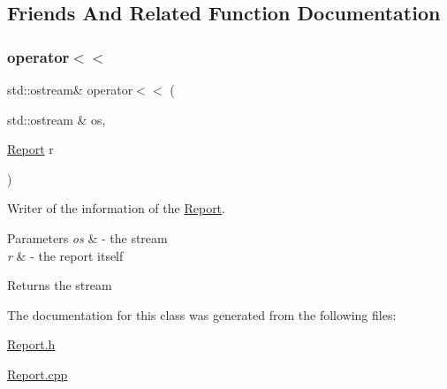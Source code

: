 \subsection{Friends And Related Function Documentation}
\mbox{\label{class_report_a9c2eaa693abfadab4a6e151daee874e4}} 
\subsubsection{\texorpdfstring{operator$<$$<$}{operator<<}}
{\footnotesize\ttfamily std\+::ostream\& operator$<$$<$ (\begin{DoxyParamCaption}\item[{std\+::ostream \&}]{os,  }\item[{\mbox{\hyperlink{class_report}{Report}}}]{r }\end{DoxyParamCaption})\hspace{0.3cm}{\ttfamily [friend]}}



Writer of the information of the \mbox{\hyperlink{class_report}{Report}}. 


\begin{DoxyParams}{Parameters}
{\em os} & -\/ the stream \\
\hline
{\em r} & -\/ the report itself \\
\hline
\end{DoxyParams}
\begin{DoxyReturn}{Returns}
the stream 
\end{DoxyReturn}


The documentation for this class was generated from the following files\+:\begin{DoxyCompactItemize}
\item 
\mbox{\hyperlink{_report_8h}{Report.\+h}}\item 
\mbox{\hyperlink{_report_8cpp}{Report.\+cpp}}\end{DoxyCompactItemize}
